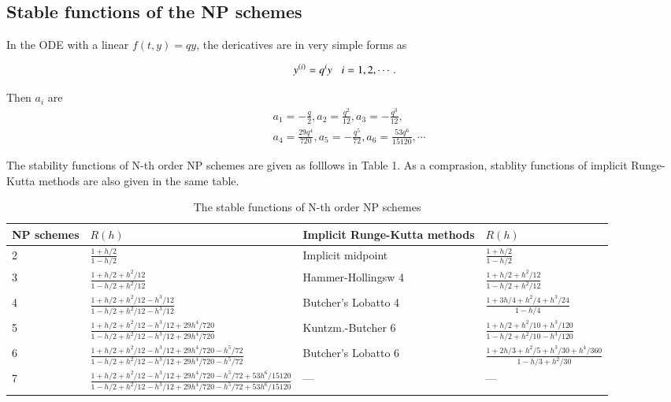 \documentclass[review]{elsarticle}
\theoremstyle{plain}\newtheorem{definition}{\sc{Definition}}
\theoremstyle{defination}\newtheorem{example}{Example}[section]
\numberwithin{equation}{section}
\numberwithin{table}{section}
\begin{document}
{	  \subsection{Stable functions of the NP schemes}
In the ODE with  a linear $f(t,y) =qy$, the dericatives are in very simple forms as  

\begin{equation}
  y^{(i)}= q^iy\hspace{0.3cm} i=1,2,\cdots.
\end{equation}

Then $a_i$ are
\begin{equation}
  \begin{aligned}
  &a_1=-\frac{q}{2},
  a_2=\frac{q^2}{12},
  a_3=-\frac{q^3}{12},\\
  &a_4=\frac{29q^4}{720},
  a_5=-\frac{q^5}{72},
  a_6=\frac{53q^6}{15120},
  \cdots
  \end{aligned}
  \end{equation}

The stability  functions of N-th order NP schemes are given as folllows in Table 1. As a comprasion,  stablity functions  of implicit Runge-Kutta methods are also given in the same table.

\begin{table}[htbp]
  \small 
  \centering
  \setlength{\belowcaptionskip}{10pt}
  \caption{\small The stable functions of N-th order NP schemes} 
  \begin{tabular}{llll}
	\toprule
	NP schemes  &$ R(h)$ & Implicit Runge-Kutta methods \cite{Hairer1987Solving}& $R(h)$\\
	\midrule
	2 & $\frac{1+h/2}{1-h/2}$& Implicit midpoint&  $\frac{1+h/2}{1-h/2}$ \\ 
	3 & $\frac{1+h/2+h^2/12}{1-h/2+h^2/12}$ & Hammer-Hollingsw 4&  $\frac{1+h/2+h^2/12}{1-h/2+h^2/12}$ \\ 
	4 & $\frac{1+h/2+h^2/12-h^3/12}{1-h/2+h^2/12-h^3/12}$ &Butcher's Lobatto 4& $\frac{1+3h/4+h^2/4+h^3/24}{1-h/4}$  \\
	5 & $\frac{1+h/2+h^2/12-h^3/12+29h^4/720}{1-h/2+h^2/12-h^3/12+29h^4/720}$ &Kuntzm.-Butcher 6 & $\frac{1+h/2+h^2/10+h^3/120}{1-h/2+h^2/10-h^3/120}$\\
	6 & $\frac{1+h/2+h^2/12-h^3/12+29h^4/720-h^5/72}{1-h/2+h^2/12-h^3/12+29h^4/720-h^5/72}$& Butcher's Lobatto 6 & $\frac{1+2h/3+h^2/5+h^3/30+h^4/360}{1-h/3+h^2/30}$\\
	7 & $\frac{1+h/2+h^2/12-h^3/12+29h^4/720-h^5/72+53h^6/15120}{1-h/2+h^2/12-h^3/12+29h^4/720-h^5/72+53h^6/15120}$ &---&---\\
	\bottomrule
  \end{tabular}
\end{table}
}
\end{document}
